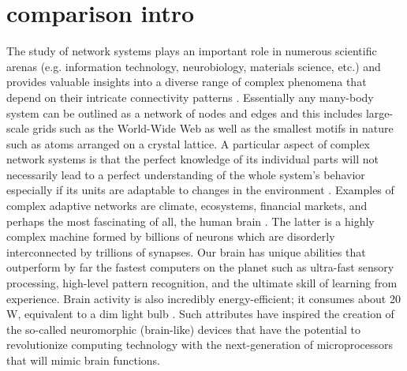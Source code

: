 \section{comparison intro}
The study of network systems plays an important role in numerous scientific arenas (e.g. information technology, neurobiology, materials science, etc.) and provides valuable insights into a diverse range of complex phenomena that depend on their intricate connectivity patterns \cite{strogatz2001,newman2003}. Essentially any many-body system can be outlined as a network of nodes and edges and this includes large-scale grids such as the World-Wide Web as well as the smallest motifs in nature such as atoms arranged on a crystal lattice. 
A particular aspect of complex network systems is that the perfect knowledge of its individual parts will not necessarily lead to a perfect understanding of the whole system's behavior especially if its units are adaptable to changes in the environment \cite{west2015,chen2015,strogatz2001}. Examples of complex adaptive networks are climate, ecosystems, financial markets, and perhaps the most fascinating of all, the human brain \cite{portillo2009}. The latter is a highly complex machine formed by billions of neurons which are disorderly interconnected by trillions of synapses. Our brain has unique abilities that outperform by far the fastest computers on the planet such as ultra-fast sensory processing, high-level pattern recognition, and the ultimate skill of learning from experience. Brain activity is also incredibly energy-efficient; it consumes about 20 W, equivalent to a dim light bulb \cite{sengupta2014}. Such attributes have inspired the creation of the so-called neuromorphic (brain-like) devices that have the potential to revolutionize computing technology with the next-generation of microprocessors that will mimic brain functions\cite{mead1990,calimera2013,prezioso2015,yang2013}.

